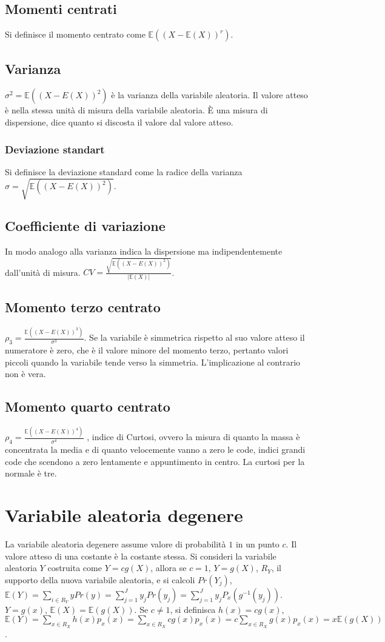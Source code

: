\subsection{Momenti centrati}
Si definisce il momento centrato come $\mathbb{E}((X-\mathbb{E}(X))^r)$.
\subsection{Varianza}
$\sigma^2=\mathbb{E}((X-E(X))^2)$ \`e la varianza della variabile aleatoria. Il valore atteso \`e nella stessa unit\`a di misura della variabile aleatoria. \`E una misura di 
dispersione, dice quanto si discosta il valore dal valore atteso. 
\subsubsection{Deviazione standart}
Si definisce la deviazione standard come la radice della varianza $\sigma=\sqrt{\mathbb{E}((X-E(X))^2)}$.
\subsection{Coefficiente di variazione}
In modo analogo alla varianza indica la dispersione ma indipendentemente dall'unit\`a di misura. $CV=\frac{\sqrt{\mathbb{E}((X-E(X))^2)}}{|\mathbb{E}(X)|}$. 
\subsection{Momento terzo centrato}
$\rho_3=\frac{\mathbb{E}((X-E(X))^3)}{\sigma^3}$. Se la variabile \`e simmetrica rispetto al suo valore atteso il numeratore \`e zero, che \`e il valore minore del momento 
terzo, pertanto valori piccoli quando la variabile tende verso la simmetria. L'implicazione al contrario non \`e vera.
\subsection{Momento quarto centrato}
$\rho_4=\frac{\mathbb{E}((X-E(X))^4)}{\sigma^4}$ , indice di Curtosi, ovvero la misura di quanto la massa \`e concentrata la media e di quanto velocemente vanno a zero le code, 
indici grandi code che scendono a zero lentamente e appuntimento in centro. La curtosi per la normale \`e tre. 
\section{Variabile aleatoria degenere}
La variabile aleatoria degenere assume valore di probabilit\`a $1$ in un punto $c$. Il valore atteso di una costante \`e la costante stessa. Si consideri la variabile aleatoria
$Y$ costruita come $Y=cg(X)$, allora se $c=1$, $Y=g(X)$, $R_Y$, il supporto della nuova variabile aleatoria, e si calcoli $Pr(Y_j)$, $\mathbb{E}(Y)=\sum\limits_{i\in R_Y}yPr(y)=
\sum\limits_{j=1}^J y_jPr(y_j)=\sum\limits_{j=1}^J y_jP_x(g^{-1}(y_j)) $. $Y=g(x)$, $\mathbb{E}(X)=\mathbb{E}(g(X))$. Se $c\neq 1$, si definisca $h(x)=cg(x)$, $\mathbb{E}(Y)=
\sum\limits_{x\in R_X} h(x)p_x(x)=\sum\limits_{x\in R_X} cg(x)p_x(x)=c\sum\limits_{x\in R_X} g(x)p_x(x)=x\mathbb{E}(g(X))$.